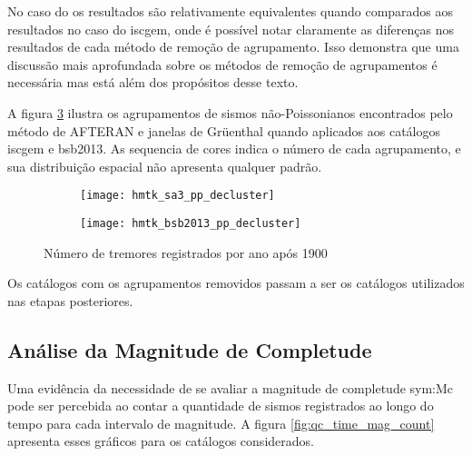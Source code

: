 No caso do  os resultados são relativamente equivalentes quando comparados aos resultados no caso do 
\glsdesc{iscgem}, onde é possível notar claramente as diferenças nos resultados de cada método de remoção de
agrupamento. Isso demonstra que uma discussão mais aprofundada sobre os métodos de 
remoção de agrupamentos é necessária mas está além dos propósitos desse texto.

A figura \ref{fig:eq_decluster} ilustra os agrupamentos de sismos não-Poissonianos encontrados 
pelo método de AFTERAN \citep{musson_2000} e janelas de Gr\"uenthal quando aplicados
aos catálogos \gls{iscgem} e \gls{bsb2013}. As sequencia de cores indica o número de cada agrupamento, e sua
distribuição espacial não apresenta qualquer padrão. 

\begin{figure}[H]
	\centering
	\begin{subfigure}[t]{0.46\textwidth}
		  	\centering
			\texttt{[image: hmtk\_sa3\_pp\_decluster]}
			\label{fig:sa_decluster}
	\end{subfigure}%
	\quad %
	\begin{subfigure}[t]{0.50\textwidth}
		  	\centering
			\texttt{[image: hmtk\_bsb2013\_pp\_decluster]}
			\label{fig:br_decluster}
    \end{subfigure}%
	\caption{Número de tremores registrados por ano após 1900}
	\label{fig:eq_decluster}
\end{figure}

Os catálogos com os agrupamentos removidos passam a ser os catálogos utilizados nas etapas posteriores.

\subsection{Análise da Magnitude de Completude}
\label{sec:completeness}

Uma evidência da necessidade de se avaliar a magnitude de completude \gls{sym:Mc}
pode ser percebida ao contar a quantidade de sismos registrados ao longo do tempo
para cada intervalo de magnitude. A figura \ref{fig:qc_time_mag_count} apresenta
esses gráficos para os catálogos considerados.

